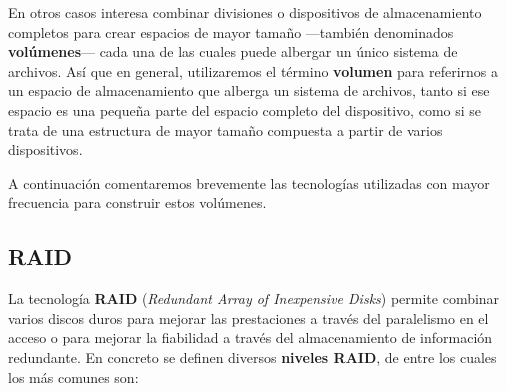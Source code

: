 En otros casos interesa combinar divisiones o dispositivos de
almacenamiento completos para crear espacios de mayor tamaño ---también
denominados \textbf{volúmenes}--- cada una de las cuales puede albergar
un único sistema de archivos. Así que en general, utilizaremos el
término \textbf{{}volumen} para referirnos a un espacio de
almacenamiento que alberga un sistema de archivos, tanto si ese espacio
es una pequeña parte del espacio completo del dispositivo, como si se
trata de una estructura de mayor tamaño compuesta a partir de varios
dispositivos.

A continuación comentaremos brevemente las tecnologías utilizadas con
mayor frecuencia para construir estos volúmenes.

\subsection{RAID}\label{_raid}

La tecnología \textbf{{}RAID} (\emph{Redundant Array of Inexpensive
Disks}) permite combinar varios discos duros para mejorar las
prestaciones a través del paralelismo en el acceso o para mejorar la
fiabilidad a través del almacenamiento de información redundante. En
concreto se definen diversos \textbf{niveles RAID}, de entre los cuales
los más comunes son:

